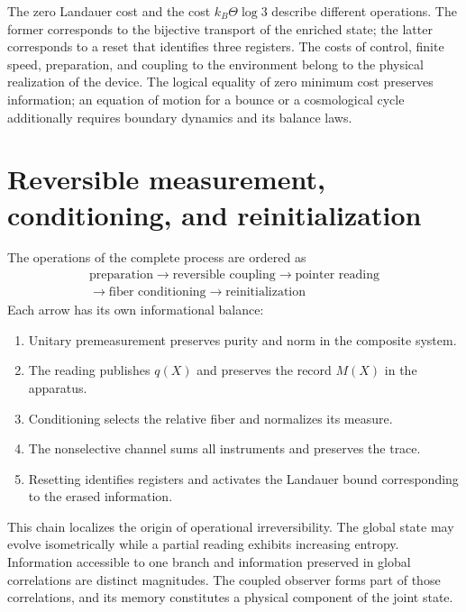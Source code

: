 The zero Landauer cost and the cost \(k_B\Theta\log3\) describe different
operations. The former corresponds to the bijective transport of the
enriched state; the latter corresponds to a reset that identifies three
registers. The costs of control, finite speed, preparation, and
coupling to the environment belong to the physical realization of the
device. The logical equality of zero minimum cost preserves
information; an equation of motion for a bounce or a
cosmological cycle additionally requires boundary dynamics and its balance laws.

\section{Reversible measurement, conditioning, and reinitialization}

The operations of the complete process are ordered as
\begin{equation}
 \boxed{\begin{gathered}
 \text{preparation}
 \longrightarrow
 \text{reversible coupling}
 \longrightarrow
 \text{pointer reading}\\
 \longrightarrow
 \text{fiber conditioning}
 \longrightarrow
 \text{reinitialization}
 \end{gathered}}
 \label{eq:rm-obs-measurement-chain}
\end{equation}
Each arrow has its own informational balance:
\begin{enumerate}[label=\textup{(\roman*)}]
 \item Unitary premeasurement preserves purity and norm
in the composite system.
 \item The reading publishes \(q(X)\) and preserves the record \(M(X)\) in the
 apparatus.
 \item Conditioning selects the relative fiber and normalizes its
 measure.
 \item The nonselective channel sums all instruments and preserves the
 trace.
 \item Resetting identifies registers and activates the Landauer bound
 corresponding to the erased information.
\end{enumerate}

This chain localizes the origin of operational irreversibility. The global
state may evolve isometrically while a partial reading
exhibits increasing entropy. Information accessible to one branch and
information preserved in global correlations are distinct
magnitudes. The coupled observer forms part of those correlations, and its
memory constitutes a physical component of the joint state.

